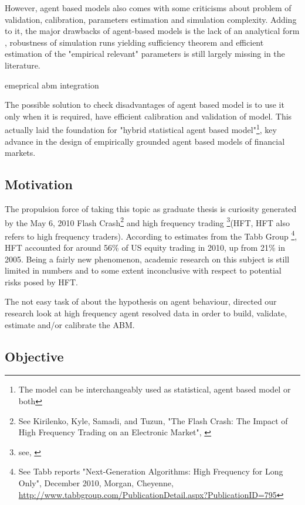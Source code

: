 \documentclass[12pt,a4paper]{article}
\numberwithin{equation}{section}
\numberwithin{figure}{section}
\numberwithin{table}{section}
\begin{document}
However, agent based models also comes with some criticisms about problem of validation, calibration, parameters estimation and simulation complexity. Adding to it, the major drawbacks of agent-based models is the lack of an analytical form \citep{LeombruniRichiardi2005}, robustness of simulation runs yielding sufficiency theorem \citep{Grazzini2011} and efficient estimation of the "empirical relevant" parameters \citep{BianchiCirilloGallegatiVagliasindi2007, Grazzini2011} is still largely missing in the literature.

emeprical abm integration  

The possible solution to check disadvantages of agent based model is to use it only when it is required, have efficient calibration and validation of model. This actually laid the foundation for "hybrid statistical agent based model"\footnote{The model can be interchangeably used as statistical, agent based model or both}, key advance in the design of empirically grounded agent based models of financial markets. 
 

\subsection{Motivation}
The propulsion force of taking this topic as graduate thesis is curiosity generated by the May 6, 2010 Flash Crash\footnote{See Kirilenko, Kyle, Samadi, and Tuzun, "The Flash Crash: The Impact of High Frequency Trading on an Electronic Market", \citet{kirilenko2010}} and high frequency trading \footnote{ see, \citet{arndt2011}}(HFT, HFT also refers to high frequency traders). According to estimates from the Tabb Group \footnote{See Tabb reports "Next-Generation Algorithms: High Frequency for Long Only", December 2010, Morgan, Cheyenne, \url{http://www.tabbgroup.com/PublicationDetail.aspx?PublicationID=795}}, HFT accounted for around 56\% of US equity trading in 2010, up from 21\% in 2005. Being a fairly new phenomenon, academic research on this subject is still limited in numbers and to some extent inconclusive with respect to potential risks posed by HFT. 

The not easy task of about the hypothesis on agent behaviour, directed our research look at high frequency agent resolved data in order to build, validate, estimate and/or calibrate the ABM. 

\subsection{Objective}
\end{document}
